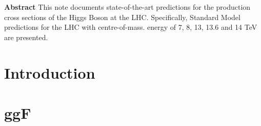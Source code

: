 \documentclass[11pt]{report}
\begin{document}
\begin{center}



\textbf{}
	\end{center}

        \thispagestyle{empty}




\mbox{}\vspace*{3em}
%
\begin{center}
    \textbf{Abstract}
 This note documents state-of-the-art predictions for the production cross sections of the Higgs Boson at the LHC. 
 Specifically, Standard Model predictions for the LHC with centre-of-mass. energy of 7, 8, 13, 13.6 and 14 TeV are presented.
\end{center}
%

\newpage

\section*{Introduction}


\section*{ggF}

\end{document}
